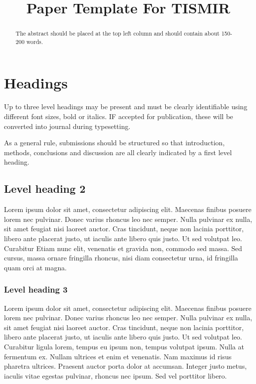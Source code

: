 \documentclass{article}
\title{Paper Template For TISMIR}
\begin{document}
%
\maketitle
%
\begin{abstract}
The abstract should be placed at the top left column and should contain about 150-200 words.
\end{abstract}
%

\section{Headings}\label{sec:headings}

Up to three level headings may be present and must be clearly identifiable
using different font sizes, bold or italics. IF accepted for publication,
these will be converted into journal during typesetting.

As a general rule, submissions should be structured so that introduction,
methods, conclusions and discussion are all clearly indicated by a first level heading.

\subsection{Level heading 2}
Lorem ipsum dolor sit amet, consectetur adipiscing elit.
Maecenas finibus posuere lorem nec pulvinar. Donec varius
rhoncus leo nec semper. Nulla pulvinar ex nulla, sit amet feugiat
nisi laoreet auctor. Cras tincidunt, neque non lacinia porttitor,
libero ante placerat justo, ut iaculis ante libero quis justo.
Ut sed volutpat leo. Curabitur
Etiam nunc elit, venenatis et gravida non, commodo sed massa.
Sed cursus, massa ornare fringilla rhoncus, nisi diam consectetur urna,
id fringilla quam orci at magna.

\subsubsection{Level heading 3}

Lorem ipsum dolor sit amet, consectetur adipiscing elit.
Maecenas finibus posuere lorem nec pulvinar. Donec varius rhoncus leo
nec semper. Nulla pulvinar ex nulla, sit amet feugiat nisi laoreet auctor.
Cras tincidunt, neque non lacinia porttitor, libero ante placerat justo,
ut iaculis ante libero quis justo. Ut sed volutpat leo. Curabitur ligula
lorem, tempus eu ipsum non, tempus volutpat ipsum. Nulla at fermentum ex.
Nullam ultrices et enim et venenatis. Nam maximus id risus pharetra ultrices.
Praesent auctor porta dolor at accumsan.
Integer justo metus, iaculis vitae egestas pulvinar, rhoncus nec ipsum.
Sed vel porttitor libero.
\end{document}
